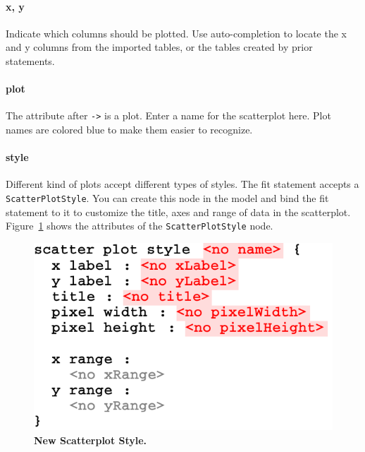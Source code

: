 \paragraph{x, y}
Indicate which columns should be plotted. Use auto-completion to locate the x and y columns from the imported tables, or the tables created by prior statements. 

\paragraph{plot}
The attribute after \texttt{->} is a plot. Enter a name for the scatterplot here. Plot names are colored blue to make them easier to recognize.

\paragraph{style}
Different kind of plots accept different types of styles. The fit statement accepts a \texttt{Scatter\allowbreak{}Plot\allowbreak{}Style}. You can create this node in the model and bind the fit statement to it to customize the title, axes and range of data in the scatterplot. Figure~\ref{fig:NewScatterPlotStyle} shows the attributes of the \texttt{ScatterPlotStyle} node.


\begin{figure}
  \centering
  \includegraphics[width=\figWidthNarrow]{figures/NewScatterPlotStyle.pdf}
\caption[New Scatterplot Style.]{\textbf{New Scatterplot Style.}}
\label{fig:NewScatterPlotStyle}
\end{figure}









